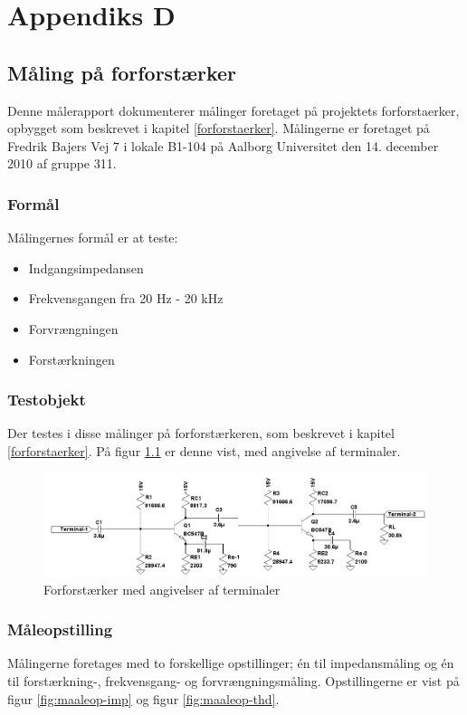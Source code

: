 %
%
\chapter{Appendiks D}
\label{maaleforforstaerker}
\section*{Måling på forforstærker}
Denne målerapport dokumenterer målinger foretaget på projektets forforstaerker, opbygget som beskrevet i kapitel \ref{forforstaerker}. Målingerne er foretaget på Fredrik Bajers Vej 7 i lokale B1-104 på Aalborg Universitet den 14. december 2010 af gruppe 311.

\subsection*{Formål}
Målingernes formål er at teste:
\begin{itemize}
\item Indgangsimpedansen
\item Frekvensgangen fra 20 Hz - 20 kHz
\item Forvrængningen
\item Forstærkningen
\end{itemize}

\subsection*{Testobjekt}
Der testes i disse målinger på forforstærkeren, som beskrevet i kapitel \ref{forforstaerker}. På figur \ref{fig:testob_forforstaerker} er denne vist, med angivelse af terminaler.

\begin{figure}[h]
\centering
\includegraphics[scale=0.42]{maalerapporter/forforstaerker/testobjekt-forforstaerker.png}
\caption{Forforstærker med angivelser af terminaler}
\label{fig:testob_forforstaerker}
\end{figure}

\subsection*{Måleopstilling}
Målingerne foretages med to forskellige opstillinger; én til impedansmåling og én til forstærkning-, frekvensgang- og forvrængningsmåling. Opstillingerne er vist på figur \ref{fig:maaleop-imp} og figur \ref{fig:maaleop-thd}.

